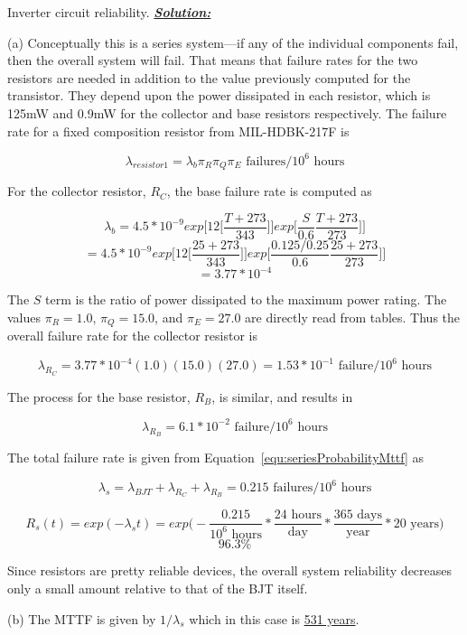 {\begin{example}{Inverter circuit reliability.}
\emph{\textbf{\ul{Solution:}}}

(a) Conceptually this is a series system---if any of the individual
components fail, then the overall system will fail. That means that
failure rates for the two resistors are needed in addition to the value
previously computed for the transistor. They depend upon the power
dissipated in each resistor, which is 125mW and 0.9mW for the collector
and base resistors respectively. The failure rate for a fixed
composition resistor from MIL-HDBK-217F is

$$\lambda_{resistor1} = \lambda_b \pi_R \pi_Q \pi_E \text{ failures}/10^6 \text{ hours}$$

For the collector resistor, $R_C$, the base failure rate is
computed as

$$ \lambda_b = 4.5*10^{-9} exp \big[ 12 \big[\frac{T+273}{343} \big] \big] exp\big[ \frac{S}{0.6} \frac{T+273}{273}\big] \big]$$
$$  = 4.5*10^{-9} exp \big[ 12 \big[\frac{25+273}{343} \big] \big] exp\big[ \frac{0.125/0.25}{0.6} \frac{25+273}{273}\big] \big]$$
$$ = 3.77*10^{-4}$$

The $S$ term is the ratio of power dissipated to the maximum power
rating. The values $\pi_R=1.0$, $\pi_Q=15.0$, and $\pi_E = 27.0$ 
are directly read from tables.
Thus the overall failure rate for the collector resistor is

$$\lambda_{R_C} = 3.77*10^{-4}(1.0)(15.0)(27.0) = 1.53*10^{-1} \text{ failure}/10^6 \text{ hours}$$

The process for the base resistor, $R_B$, is similar, and results in

$$\lambda_{R_B} = 6.1*10^{-2} \text{ failure}/10^6 \text{ hours}$$

The total failure rate is given from Equation~\ref{equ:seriesProbabilityMttf} as

$$\lambda_s = \lambda_{BJT} + \lambda_{R_C} + \lambda_{R_B} = 0.215 \text{ failures}/10^6 \text{ hours}$$

$$R_s(t) =exp(-\lambda_s t) = exp \big( -\frac{0.215}{10^6 \text{ hours}} * \frac{24 \text{ hours} } {\text{day}} * \frac{365 \text{ days}}{\text{year}} * 20 \text{ years} \big)$$
$$96.3 \%$$

Since resistors are pretty reliable devices, the overall system
reliability decreases only a small amount relative to that of the BJT
itself.

(b) The MTTF is given by $1/\lambda_s$ which in this case is \ul{531 years}.
\end{example}



}
